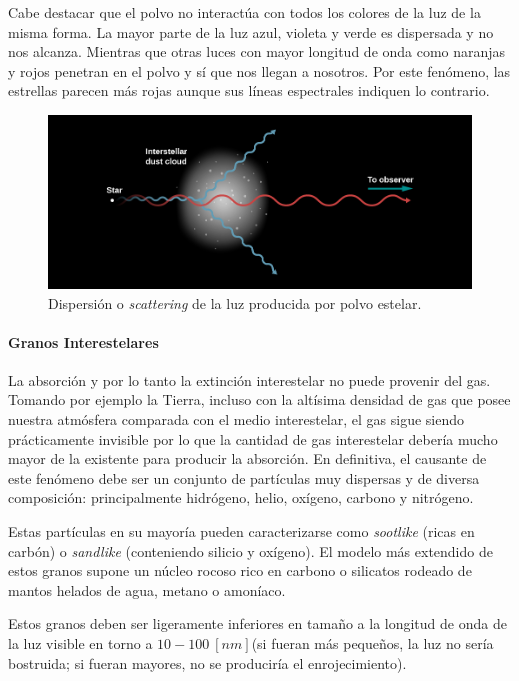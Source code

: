\documentclass{tufte-handout}
\begin{document}
Cabe destacar que el polvo no interactúa con todos los colores de la luz de la misma forma. La mayor parte de la luz azul, violeta y verde es dispersada y no nos alcanza. Mientras que otras luces con mayor longitud de onda como naranjas y rojos penetran en el polvo y sí que nos llegan a nosotros. Por este fenómeno, las estrellas parecen más rojas aunque sus líneas espectrales indiquen lo contrario.

\begin{figure}
  \includegraphics[width=\linewidth]{img/scatter}
  \caption{Dispersión o \emph{scattering} de la luz producida por polvo estelar.}
\end{figure}

\paragraph{Granos Interestelares}

La absorción y por lo tanto la extinción interestelar no puede provenir del gas. Tomando por ejemplo la Tierra, incluso con la altísima densidad de gas que posee nuestra atmósfera comparada con el medio interestelar, el gas sigue siendo prácticamente invisible por lo que la cantidad de gas interestelar debería mucho mayor de la existente para producir la absorción. En definitiva, el causante de este fenómeno debe ser un conjunto de partículas muy dispersas y de diversa composición: principalmente hidrógeno, helio, oxígeno, carbono y nitrógeno.

Estas partículas en su mayoría pueden caracterizarse como \emph{sootlike} (ricas en carbón) o \emph{sandlike} (conteniendo silicio y oxígeno). El modelo más extendido de estos granos supone un núcleo rocoso rico en carbono o silicatos rodeado de mantos helados de agua, metano o amoníaco.

Estos granos deben ser ligeramente inferiores en tamaño a la longitud de onda de la luz visible en torno a $10-100~[nm]$(si fueran más pequeños, la luz no sería bostruida; si fueran mayores, no se produciría el enrojecimiento).
\end{document}
